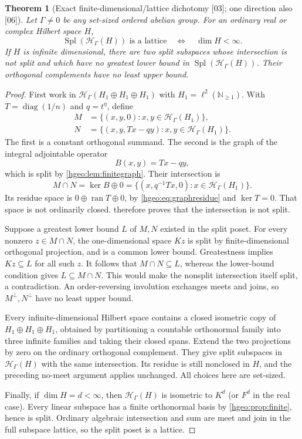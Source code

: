 \documentclass[11pt,letterpaper]{article}
\numberwithin{equation}{section}
\newtheorem{theorem}{Theorem}[section]
\theoremstyle{definition}
\theoremstyle{remark}
\newcommand{\N}{\mathbb N}
\newcommand{\F}{F}
\newcommand{\K}{K}
\newcommand{\HH}[1]{\mathscr H_\Gamma(#1)}
\newcommand{\ran}{\operatorname{ran}}
\newcommand{\diag}{\operatorname{diag}}
\newcommand{\Spl}{\operatorname{Spl}}
\newcommand{\src}[1]{\textup{\textsf{\small[#1]}}}
\begin{document}
\begin{theorem}[Exact finite-dimensional/lattice dichotomy \src{03};
one direction also \src{06}]\label{hgeo:thm:lattice}
Let $\Gamma\ne0$ be any set-sized ordered abelian group. For an
ordinary real or complex Hilbert space $H$,
\[
 \Spl(\HH{H})\text{ is a lattice}
 \quad\Longleftrightarrow\quad \dim H<\infty.
\]
If $H$ is infinite dimensional, there are two split subspaces whose
intersection is not split and which have no greatest lower bound in
$\Spl(\HH{H})$. Their orthogonal complements have no least upper bound.
\end{theorem}
\begin{proof}
First work in $\HH{H_1\oplus H_1\oplus H_1}$ with
$H_1=\ell^2(\N_{\ge1})$. With $T=\diag(1/n)$ and $q=t^\eta$, define
\begin{align*}
 M&=\{(x,y,0):x,y\in\HH{H_1}\},\\
 N&=\{(x,y,Tx-qy):x,y\in\HH{H_1}\}.
\end{align*}
The first is a constant orthogonal summand. The second is the graph
of the integral adjointable operator
\begin{equation}\label{hgeo:eq:rowB}
 B(x,y)=Tx-qy,
\end{equation}
which is split by \cref{hgeo:lem:finitegraph}. Their intersection is
\begin{equation}\label{hgeo:eq:intersection}
 M\cap N=\ker B\oplus0=\{(x,q^{-1}Tx,0):x\in\HH{H_1}\}.
\end{equation}
Its residue space is $0\oplus\ran T\oplus0$, by \eqref{hgeo:eq:graphresidue}
and $\ker T=0$. That space is not ordinarily closed. 
therefore proves that the intersection is not split.

Suppose a greatest lower bound $L$ of $M,N$ existed in the split
poset. For every nonzero $z\in M\cap N$, the one-dimensional space
$\K z$ is split by finite-dimensional orthogonal projection, and is
a common lower bound. Greatestness implies $\K z\subseteq L$ for
all such $z$. It follows that $M\cap N\subseteq L$, whereas the
lower-bound condition gives $L\subseteq M\cap N$. This would make
the nonsplit intersection itself split, a contradiction. An
order-reversing involution exchanges meets and joins, so
$M^\perp,N^\perp$ have no least upper bound.

Every infinite-dimensional Hilbert space contains a closed isometric
copy of $H_1\oplus H_1\oplus H_1$, obtained by partitioning a countable
orthonormal family into three infinite families and taking their
closed spans. Extend the two projections by zero on the ordinary
orthogonal complement. They give split subspaces in $\HH{H}$ with
the same intersection. Its residue is still nonclosed in $H$, and
the preceding no-meet argument applies unchanged. All choices here
are set-sized.

Finally, if $\dim H=d<\infty$, then $\HH{H}$ is isometric to
$\K^d$ (or $\F^d$ in the real case). Every linear subspace has a
finite orthonormal basis by \cref{hgeo:prop:finite}, hence is
split. Ordinary algebraic intersection and sum are meet and join
in the full subspace lattice, so the split poset is a lattice.
\end{proof}
\end{document}
